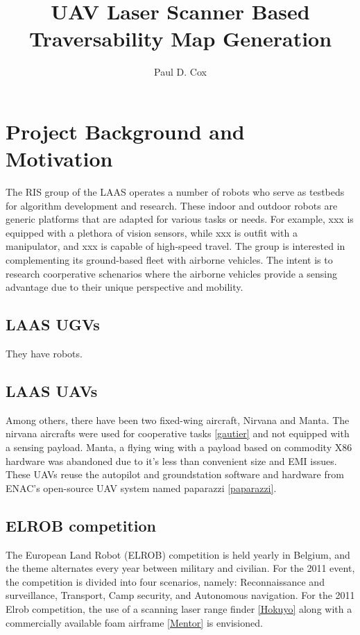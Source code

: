 \documentclass[a4paper,11pt]{report}
\title{UAV Laser Scanner Based Traversability Map Generation}
\author{Paul D. Cox}
\begin{document}
\maketitle

\section{Project Background and Motivation}

The RIS group of the LAAS operates a number of robots who serve as testbeds for algorithm development and research. These indoor and outdoor robots are generic platforms that are adapted for various tasks or needs. For example, xxx is equipped with a plethora of vision sensors, while xxx is outfit with a manipulator, and xxx is capable of high-speed travel. The group is interested in complementing its ground-based fleet with airborne vehicles. The intent is to research coorperative schenarios where the airborne vehicles provide a sensing advantage due to their unique perspective and mobility.

\subsection{LAAS UGVs}

They have robots.

\subsection{LAAS UAVs}

Among others, there have been two fixed-wing aircraft, Nirvana and Manta. The nirvana aircrafts were used for cooperative tasks \ref{gautier} and not equipped with a sensing payload. Manta, a flying wing with a payload based on commodity X86 hardware was abandoned due to it's less than convenient size and EMI issues. These UAVs reuse the autopilot and groundstation software and hardware from ENAC's open-source UAV system named paparazzi \ref{paparazzi}.

\subsection{ELROB competition}

The European Land Robot (ELROB) competition is held yearly in Belgium, and the theme alternates every year between military and civilian. For the 2011 event, the competition is divided into four scenarios, namely: Reconnaissance and surveillance, Transport, Camp security, and Autonomous navigation. For the 2011 Elrob competition, the use of a scanning laser range finder \ref{Hokuyo} along with a commercially available foam airframe \ref{Mentor} is envisioned.
\end{document}
